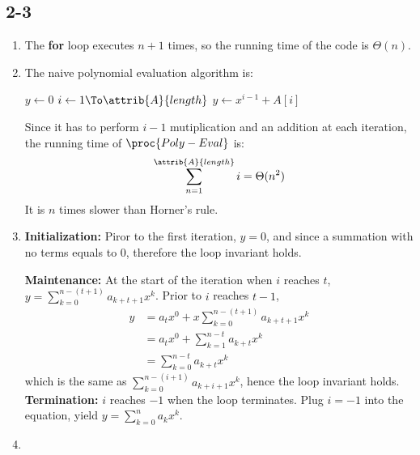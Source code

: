 \subsection{2-3}
\begin{enumerate}[leftmargin=*]
    \item The \textbf{for} loop executes $n+1$ times, so the running time of
        the code is $\Theta(n)$.
    \item The naive polynomial evaluation algorithm is: \\
        \vspace{-1.5em}
        \begin{codebox}
        \li $y\gets 0$
        \li \For $i\gets 1 \To \attrib{A}{length}$
            \Do
        \li     $y\gets x^{i-1}+A[i]$
            \End
        \end{codebox}
        Since it has to perform $i-1$ mutiplication and an addition at each
        iteration, the running time of $\proc{Poly-Eval}$ is:
        \begin{displaymath}
            \sum_{n=1}^{\attrib{A}{length}} i=\Theta(n^2)
        \end{displaymath}
        It is $n$ times slower than Horner's rule.
    \item \textbf{Initialization:} Piror to the first iteration, $y=0$, and
        since a summation with no terms equals to $0$, therefore the loop
        invariant holds.

        \textbf{Maintenance:} At the start of the iteration when $i$ reaches $t$,
        $y=\sum_{k=0}^{n-(t+1)}a_{k+t+1}x^k$. Prior to $i$ reaches $t-1$,
        \begin{align*}
            y&= a_tx^0+x\sum_{k=0}^{n-(t+1)}a_{k+t+1}x^k\\
             &= a_tx^0+\sum_{k=1}^{n-t}a_{k+t}x^k\\
             &= \sum_{k=0}^{n-t}a_{k+t}x^k
        \end{align*}
        which is the same as $\sum_{k=0}^{n-(i+1)}a_{k+i+1}x^k$, hence the
        loop invariant holds.\\

        \textbf{Termination:} $i$ reaches $-1$ when the loop terminates.
        Plug $i=-1$ into the equation, yield $y=\sum_{k=0}^{n}a_kx^k$.
    \item
\end{enumerate}
